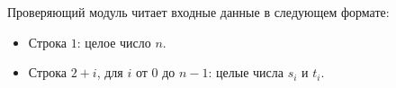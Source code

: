 Проверяющий модуль читает входные данные в следующем формате: 
\begin{itemize}
\item Строка $1$: целое число $n$.
\item Строка $2 + i$, для $i$ от $0$ до $n - 1$: целые числа $s_i$ и $t_i$.
\end{itemize}